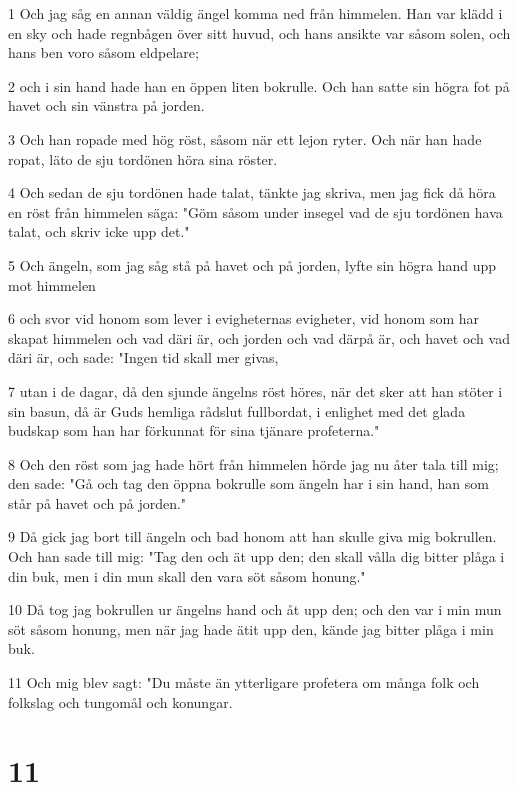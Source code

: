\par 1 Och jag såg en annan väldig ängel komma ned från himmelen. Han var klädd i en sky och hade regnbågen över sitt huvud, och hans ansikte var såsom solen, och hans ben voro såsom eldpelare;
\par 2 och i sin hand hade han en öppen liten bokrulle. Och han satte sin högra fot på havet och sin vänstra på jorden.
\par 3 Och han ropade med hög röst, såsom när ett lejon ryter. Och när han hade ropat, läto de sju tordönen höra sina röster.
\par 4 Och sedan de sju tordönen hade talat, tänkte jag skriva, men jag fick då höra en röst från himmelen säga: "Göm såsom under insegel vad de sju tordönen hava talat, och skriv icke upp det."
\par 5 Och ängeln, som jag såg stå på havet och på jorden, lyfte sin högra hand upp mot himmelen
\par 6 och svor vid honom som lever i evigheternas evigheter, vid honom som har skapat himmelen och vad däri är, och jorden och vad därpå är, och havet och vad däri är, och sade: "Ingen tid skall mer givas,
\par 7 utan i de dagar, då den sjunde ängelns röst höres, när det sker att han stöter i sin basun, då är Guds hemliga rådslut fullbordat, i enlighet med det glada budskap som han har förkunnat för sina tjänare profeterna."
\par 8 Och den röst som jag hade hört från himmelen hörde jag nu åter tala till mig; den sade: "Gå och tag den öppna bokrulle som ängeln har i sin hand, han som står på havet och på jorden."
\par 9 Då gick jag bort till ängeln och bad honom att han skulle giva mig bokrullen. Och han sade till mig: "Tag den och ät upp den; den skall vålla dig bitter plåga i din buk, men i din mun skall den vara söt såsom honung."
\par 10 Då tog jag bokrullen ur ängelns hand och åt upp den; och den var i min mun söt såsom honung, men när jag hade ätit upp den, kände jag bitter plåga i min buk.
\par 11 Och mig blev sagt: "Du måste än ytterligare profetera om många folk och folkslag och tungomål och konungar.

\chapter{11}


